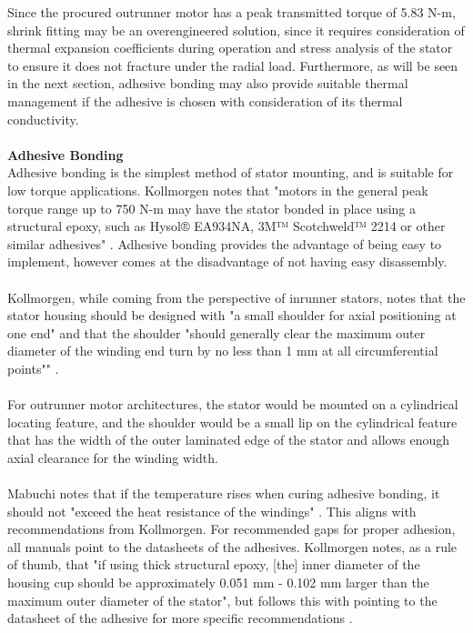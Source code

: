 \documentclass[internal]{../../../classes/nervtech-research}
\begin{document}
Since the procured outrunner motor has a peak transmitted torque of 5.83 N-m, shrink fitting may be an overengineered solution, since it requires consideration of thermal expansion coefficients during operation and stress analysis of the stator to ensure it does not fracture under the radial load.
Furthermore, as will be seen in the next section, adhesive bonding may also provide suitable thermal management if the adhesive is chosen with consideration of its thermal conductivity.
\\\\
\textbf{Adhesive Bonding}
\\
Adhesive bonding is the simplest method of stator mounting, and is suitable for low torque applications.
Kollmorgen notes that "motors in the general peak torque range up to 750 N-m may have the stator bonded in place using a structural epoxy, such as Hysol® EA934NA, 3M™ Scotchweld™ 2214 or other similar adhesives" \cite{KollmorgenManual}.
Adhesive bonding provides the advantage of being easy to implement, however comes at the disadvantage of not having easy disassembly.
\\\\
Kollmorgen, while coming from the perspective of inrunner stators, notes that the stator housing should be designed with "a small shoulder for axial positioning at one end" and that the shoulder "should generally clear the maximum outer diameter of the winding end turn by no less than 1 mm at all circumferential points"" \cite{KollmorgenManual}.
\\\\
For outrunner motor architectures, the stator would be mounted on a cylindrical locating feature, and the shoulder would be a small lip on the cylindrical feature that has the width of the outer laminated edge of the stator and allows enough axial clearance for the winding width.
\\\\
Mabuchi notes that if the temperature rises when curing adhesive bonding, it should not "exceed the heat resistance of the windings" \cite{MabuchiManual}.
This aligns with recommendations from Kollmorgen.
For recommended gaps for proper adhesion, all manuals point to the datasheets of the adhesives.
Kollmorgen notes, as a rule of thumb, that "if using thick structural epoxy, [the] inner diameter of the housing cup should be approximately 0.051 mm - 0.102 mm larger than the maximum outer diameter of the stator", but follows this with pointing to the datasheet of the adhesive for more specific recommendations \cite{KollmorgenManual}.
\end{document}
